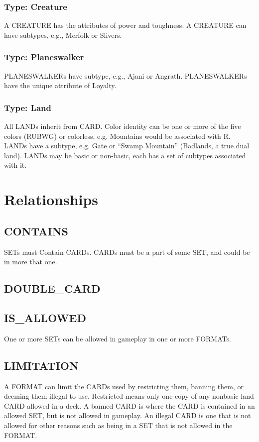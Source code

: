 \documentclass{article}
\begin{document}
\subsubsection{Type: Creature}
A CREATURE has the attributes of power and toughness. %
A CREATURE can have subtypes, e.g., Merfolk or Slivers.
\subsubsection{Type: Planeswalker}
PLANESWALKERs have subtype, e.g., Ajani or Angrath.
PLANESWALKERs have the unique attribute of Loyalty.
\subsubsection{Type: Land}
All LANDs inherit from CARD.
Color identity can be one or more of the five colors (RUBWG) or colorless, e.g.  Mountains would be associated with R.
LANDs have a subtype, e.g. Gate or “Swamp Mountain” (Badlands, a true dual land).
LANDs may be basic or non-basic, each has a set of cubtypes associated with it.
\section{Relationships}
\subsection{CONTAINS}
SETs must Contain CARDs.
CARDs must be a part of some SET, and could be in more that one.
\subsection{DOUBLE\_CARD}
\subsection{IS\_ALLOWED}
One or more SETs can be allowed in gameplay in one or more FORMATs.
\subsection{LIMITATION}
A FORMAT can limit the CARDs used by restricting them, banning them, or deeming them illegal to use.
Restricted means only one copy of any nonbasic land CARD allowed in a deck.
A banned CARD is where the CARD is contained in an allowed SET, but is not allowed in gameplay.
An illegal CARD is one that is not allowed for other reasons such as being in a SET that is not allowed in the FORMAT.
\end{document}
